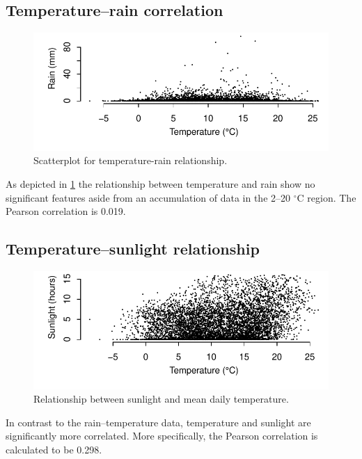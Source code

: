 \documentclass[10pt]{article}\usepackage[]{graphicx}\usepackage[]{color}
\makeatletter
\def\maxwidth{ %
  \ifdim\Gin@nat@width>\linewidth
    \linewidth
  \else
    \Gin@nat@width
  \fi
}
\newenvironment{knitrout}{}{} %
\theoremstyle{plain}
\makeatother
\begin{document}
\subsection{Temperature--rain correlation}
\begin{knitrout}
\color{fgcolor}\begin{figure}[H]

{\centering \includegraphics[width=\maxwidth]{figure/graphics-tempVSrain-1} 

}

\caption[Scatterplot for temperature-rain relationship]{Scatterplot for temperature-rain relationship.}\label{fig:tempVSrain}
\end{figure}


\end{knitrout}

As depicted in \cref{fig:tempVSrain} the relationship between temperature and rain show no significant features aside from an accumulation of data in the 2--20 $^\circ$C region. The Pearson correlation is 0.019.

\subsection{Temperature--sunlight relationship}
\begin{knitrout}
\color{fgcolor}\begin{figure}[H]

{\centering \includegraphics[width=\maxwidth]{figure/graphics-tempVSsun-1} 

}

\caption[Relationship between sunlight and mean daily temperature]{Relationship between sunlight and mean daily temperature.}\label{fig:tempVSsun}
\end{figure}


\end{knitrout}
In contrast to the rain--temperature data, temperature and sunlight are significantly more correlated. More specifically, the Pearson correlation is calculated to be 0.298.
\end{document}
